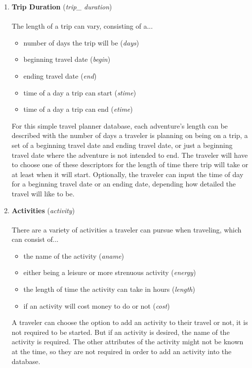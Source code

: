 \documentclass[letterpaper,10pt,onecolumn,compsoc]{IEEEtran}
\begin{document}
\begin{enumerate}
\item 
\textbf{Trip Duration} (\textit{trip\_ duration})
\\ ~ \\ The length of a trip can vary, consisting of a...
\begin{itemize}
	\item number of days the trip will be (\textit{days})
	\item beginning travel date (\textit{begin})
	\item ending travel date (\textit{end})
	\item time of a day a trip can start (\textit{stime})
	\item time of a day a trip can end (\textit{etime})
\end{itemize}
For this simple travel planner database, each adventure's length can be described with the number of days a traveler is planning on being on a trip, a set of a beginning travel date and ending travel date, or just a beginning travel date where the adventure is not intended to end. The traveler will have to choose one of these descriptors for the length of time there trip will take or at least when it will start. Optionally, the traveler can input the time of day for a beginning travel date or an ending date, depending how detailed the travel will like to be.
\\

\newpage

\item 
\textbf{Activities} (\textit{activity})
\\ ~ \\ There are a variety of activities a traveler can pursue when traveling, which can consist of...
\begin{itemize}
	\item the name of the activity (\textit{aname})
	\item either being a leisure or more strenuous activity (\textit{energy})
	\item the length of time the activity can take in hours (\textit{length})
	\item if an activity will cost money to do or not (\textit{cost})
\end{itemize}
A traveler can choose the option to add an activity to their travel or not, it is not required to be started. But if an activity is desired, the name of the activity is required. The other attributes of the activity might not be known at the time, so they are not required in order to add an activity into the database.

\end{enumerate}
\end{document}
